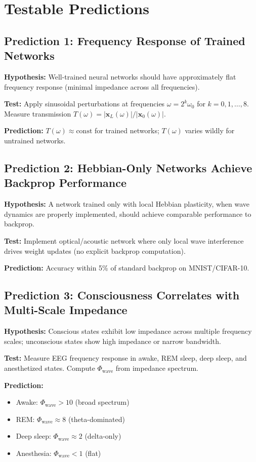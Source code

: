 \documentclass{article}
\begin{document}
\section{Testable Predictions}
\label{sec:predictions}

\subsection{Prediction 1: Frequency Response of Trained Networks}

\textbf{Hypothesis:} Well-trained neural networks should have approximately flat frequency response (minimal impedance across all frequencies).

\textbf{Test:} Apply sinusoidal perturbations at frequencies $\omega = 2^k \omega_0$ for $k = 0, 1, \ldots, 8$. Measure transmission $T(\omega) = |\mathbf{x}_L(\omega)| / |\mathbf{x}_0(\omega)|$.

\textbf{Prediction:} $T(\omega) \approx \text{const}$ for trained networks; $T(\omega)$ varies wildly for untrained networks.

\subsection{Prediction 2: Hebbian-Only Networks Achieve Backprop Performance}

\textbf{Hypothesis:} A network trained only with local Hebbian plasticity, when wave dynamics are properly implemented, should achieve comparable performance to backprop.

\textbf{Test:} Implement optical/acoustic network where only local wave interference drives weight updates (no explicit backprop computation).

\textbf{Prediction:} Accuracy within 5\% of standard backprop on MNIST/CIFAR-10.

\subsection{Prediction 3: Consciousness Correlates with Multi-Scale Impedance}

\textbf{Hypothesis:} Conscious states exhibit low impedance across multiple frequency scales; unconscious states show high impedance or narrow bandwidth.

\textbf{Test:} Measure EEG frequency response in awake, REM sleep, deep sleep, and anesthetized states. Compute $\Phi_{\text{wave}}$ from impedance spectrum.

\textbf{Prediction:} 
\begin{itemize}
\item Awake: $\Phi_{\text{wave}} > 10$ (broad spectrum)
\item REM: $\Phi_{\text{wave}} \approx 8$ (theta-dominated)
\item Deep sleep: $\Phi_{\text{wave}} \approx 2$ (delta-only)
\item Anesthesia: $\Phi_{\text{wave}} < 1$ (flat)
\end{itemize}
\end{document}
